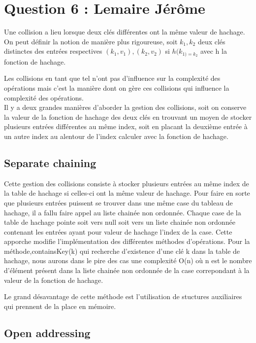 \documentclass[10pt,a4paper]{article}
\begin{document}
\section*{Question 6 : Lemaire Jérôme}

Une collision a lieu lorsque deux clés différentes ont la même valeur de hachage. On peut définir la notion de manière plus rigoureuse, soit $ k_{1}, k_{2} $ deux clés distinctes des entrées respectives $ (k_{1},v_{1}),(k_{2},v_{2}) $ si $ h(k_{1) = k_{2}} $ avec h la fonction de hachage.

Les collisions en tant que tel n'ont pas d'influence sur la complexité des opérations mais c'est la manière dont on gère ces collisions qui influence la complexité des opérations.\\
Il y a deux grandes manières d'aborder la gestion des collisions, soit on conserve la valeur de la fonction de hachage des deux clés en trouvant un moyen de stocker plusieurs entrées différentes au même index, soit en placant la deuxième entrée à un autre index au alentour de l'index calculer avec la fonction de hachage.\\

\subsection*{Separate chaining}

Cette gestion des collisions consiste à stocker plusieurs entrées au même index de la table de hachage si celles-ci ont la même valeur de hachage. Pour faire en sorte que plusieurs entrées puissent se trouver dans une même case du tableau de hachage, il a fallu faire appel au liste chainée non ordonnée. Chaque case de la table de hachage pointe soit vers null soit vers un liste chainée non ordonnée contenant les entrées ayant pour valeur de hachage l'index de la case. 
Cette apporche modifie l'implémentation des différentes méthodes d'opérations. Pour la méthode,containsKey(k) qui recherche d'existence d'une clé k dans la table de hachage, nous aurons dans le pire des cas une complexité O(n) où n est le nombre d'élément présent dans la liste chainée non ordonnée de la case correpondant à la valeur de la fonction de hachage. 

Le grand désavantage de cette méthode est l'utilisation de stuctures auxiliaires qui prennent de la place en mémoire.
 
 \subsection*{Open addressing}
 
\end{document}
